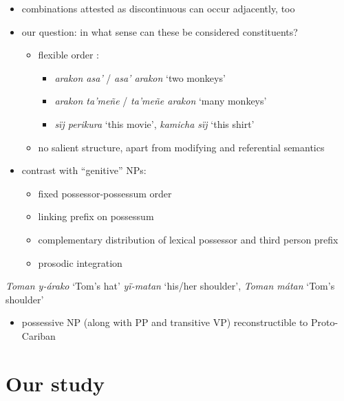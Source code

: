 \documentclass[10pt]{article}
\begin{document}
\begin{itemize}
\tightlist
\item
  combinations attested as discontinuous can occur adjacently, too
\item
  our question: in what sense can these be considered constituents?

  \begin{itemize}
  \tightlist
  \item
    flexible order \parencites[128]{payne1993nonconfigurationality}:

    \begin{itemize}
    \tightlist
    \item
      \emph{arakon asa'} / \emph{asa' arakon} `two monkeys'
    \item
      \emph{arakon ta'meñe} / \emph{ta'meñe arakon} `many monkeys'
    \item
      \emph{sïj perikura} `this movie', \emph{kamicha sïj} `this shirt'
    \end{itemize}
  \item
    no salient structure, apart from modifying and referential semantics
  \end{itemize}
\item
  contrast with ``genitive'' NPs:

  \begin{itemize}
  \tightlist
  \item
    fixed possessor-possessum order
  \item
    linking prefix on possessum
  \item
    complementary distribution of lexical possessor and third person
    prefix
  \item
    prosodic integration
  \end{itemize}
\end{itemize}

\pex\label{nps} \a\label{panposs} \emph{Toman y-árako} `Tom's hat'
\parencites[125]{payne1993nonconfigurationality} \a\label{araposs}
\emph{yï-matan} `his/her shoulder', \emph{Toman mátan} `Tom's shoulder'
\parencites[76]{panarepayne2013} \xe

\begin{itemize}
\tightlist
\item
  possessive NP (along with PP and transitive VP) reconstructible to
  Proto-Cariban
\end{itemize}

\section{Our study}
\end{document}

